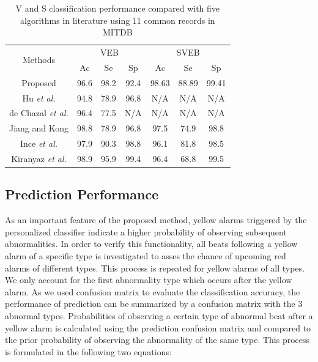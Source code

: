 \begin{table}[tbp]
\centering
\caption{V and S classification performance compared with five algorithms in literature using 11 common records in MITDB}
\label{table:classification_comp}
\begin{tabular}{|c|c|c|c|c|c|c|}
\hline
\multirow{2}{*}{Methods} & \multicolumn{3}{c|}{VEB} & \multicolumn{3}{c|}{SVEB} \\ \cline{2-7} 
                         & Ac     & Se     & Sp     & Ac      & Se     & Sp     \\ \hline
Proposed                 & 96.6   & 98.2   & 92.4   & 98.63   & 88.89  & 99.41  \\ \hline
Hu \textit{et al.}\cite{Hu_et_al}     & 94.8   & 78.9   & 96.8   & N/A     & N/A    & N/A    \\ \hline
de Chazal \textit{et al.}\cite{autofs}  & 96.4   & 77.5   & N/A    & N/A     & N/A    & N/A    \\ \hline
Jiang and Kong \cite{bbnn}    & 98.8   & 78.9   & 96.8   & 97.5    & 74.9   & 98.8   \\ \hline
Ince \textit{et al.} \cite{ince2009generic}    & 97.9   & 90.3   & 98.8   & 96.1    & 81.8   & 98.5   \\ \hline
Kiranyaz \textit{et al.}\cite{Kiranyaz}         & 98.9   & 95.9   & 99.4   & 96.4    & 68.8   & 99.5   \\ \hline
\end{tabular}
\end{table}

\subsection{Prediction Performance}

As an important feature of the proposed method, yellow alarms triggered by the personalized classifier indicate a higher probability of observing subsequent abnormalities. In order to verify this functionality, all beats following a yellow alarm of a specific type is investigated to asses the chance of upcoming red alarms of different types. This process is repeated for yellow alarms of all types. We only account for the first abnormality type which occurs after the yellow alarm. As we used confusion matrix to evaluate the classification accuracy, the performance of prediction can be summarized by a confusion matrix with the 3 abnormal types. Probabilities of observing a certain type of abnormal beat after a yellow alarm is calculated using the prediction confusion matrix and compared to the prior probability of observing the abnormality of the same type. This process is formulated in the following two equations:

